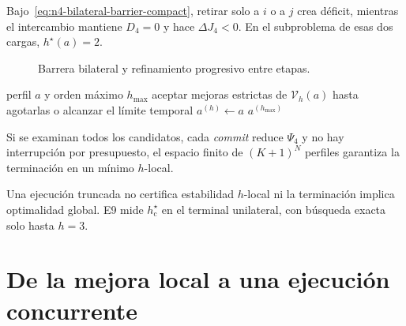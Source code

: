 \begin{n1lema}
Bajo~\eqref{eq:n4-bilateral-barrier-compact}, retirar solo a $i$ o a $j$ crea
déficit, mientras el intercambio mantiene $D_4=0$ y hace $\Delta J_4<0$. En el
subproblema de esas dos cargas, $h^\star(a)=2$.
\end{n1lema}

\begin{figure}[H]
\centering
\scalebox{.74}{}
\caption{Barrera bilateral y refinamiento progresivo entre etapas.}
\label{fig:n4-bilateral-barrier}
\viuownsource
\end{figure}
\vspace{-4mm}

\begin{algorithm}[H]
\caption{Refinamiento $h$-local de Geo-QPG}
\label{alg:n4-progressive}
\footnotesize
\begin{algorithmic}[1]
\Require perfil $a$ y orden máximo $h_{\max}$
  \State aceptar mejoras estrictas de $\mathcal V_h(a)$ hasta agotarlas o alcanzar el límite temporal
  \State $a^{(h)}\gets a$
\EndFor
\State \Return $a^{(h_{\max})}$
\end{algorithmic}
\end{algorithm}
\vspace{-2mm}

\begin{n1prop}
Si se examinan todos los candidatos, cada \emph{commit} reduce $\Psi_4$ y no hay
interrupción por presupuesto, el espacio finito de $(K+1)^N$ perfiles garantiza
la terminación en un mínimo $h$-local.
\end{n1prop}
Una ejecución truncada no certifica estabilidad $h$-local ni la terminación
implica optimalidad global. E9 mide $h_{\mathrm c}^\star$ en el terminal
unilateral, con búsqueda exacta solo hasta $h=3$.
\endgroup

\clearpage

\section*{De la mejora local a una ejecución concurrente}
\enlargethispage{1\baselineskip}

